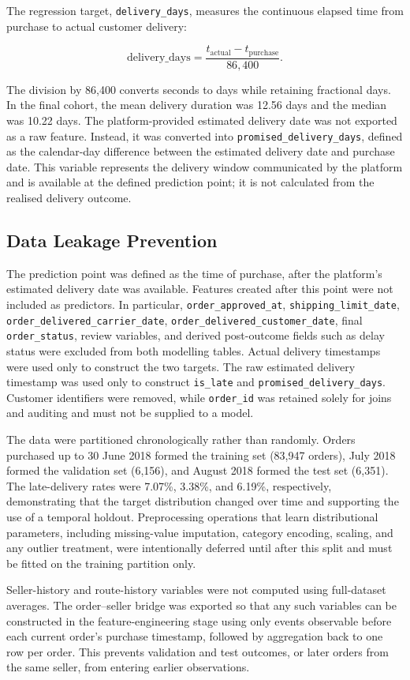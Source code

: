 The regression target, \texttt{delivery\_days}, measures the continuous elapsed time from purchase to actual customer delivery:

\begin{equation}
\mathrm{delivery\_days} =
\frac{t_{\mathrm{actual}}-t_{\mathrm{purchase}}}{86{,}400}.
\end{equation}

The division by 86,400 converts seconds to days while retaining fractional days. In the final cohort, the mean delivery duration was 12.56 days and the median was 10.22 days. The platform-provided estimated delivery date was not exported as a raw feature. Instead, it was converted into \texttt{promised\_delivery\_days}, defined as the calendar-day difference between the estimated delivery date and purchase date. This variable represents the delivery window communicated by the platform and is available at the defined prediction point; it is not calculated from the realised delivery outcome.

\subsection{Data Leakage Prevention}

The prediction point was defined as the time of purchase, after the platform's estimated delivery date was available. Features created after this point were not included as predictors. In particular, \texttt{order\_approved\_at}, \texttt{shipping\_limit\_date}, \texttt{order\_delivered\_carrier\_date}, \texttt{order\_delivered\_customer\_date}, final \texttt{order\_status}, review variables, and derived post-outcome fields such as delay status were excluded from both modelling tables. Actual delivery timestamps were used only to construct the two targets. The raw estimated delivery timestamp was used only to construct \texttt{is\_late} and \texttt{promised\_delivery\_days}. Customer identifiers were removed, while \texttt{order\_id} was retained solely for joins and auditing and must not be supplied to a model.

The data were partitioned chronologically rather than randomly. Orders purchased up to 30 June 2018 formed the training set (83,947 orders), July 2018 formed the validation set (6,156), and August 2018 formed the test set (6,351). The late-delivery rates were 7.07\%, 3.38\%, and 6.19\%, respectively, demonstrating that the target distribution changed over time and supporting the use of a temporal holdout. Preprocessing operations that learn distributional parameters, including missing-value imputation, category encoding, scaling, and any outlier treatment, were intentionally deferred until after this split and must be fitted on the training partition only.

Seller-history and route-history variables were not computed using full-dataset averages. The order--seller bridge was exported so that any such variables can be constructed in the feature-engineering stage using only events observable before each current order's purchase timestamp, followed by aggregation back to one row per order. This prevents validation and test outcomes, or later orders from the same seller, from entering earlier observations.
